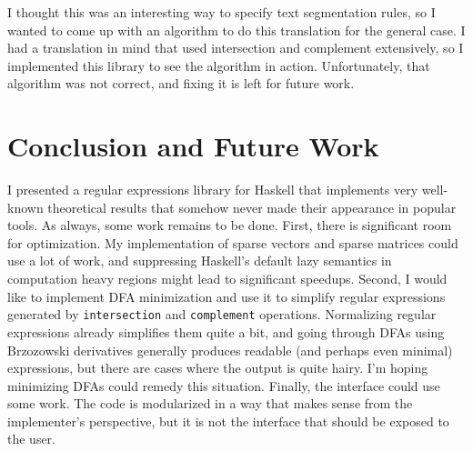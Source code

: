 \documentclass[11pt]{article}
\newcommand{\haskell}{\lstinline}
\begin{document}
I thought this was an interesting way to specify text segmentation rules, so I wanted to come up with an algorithm to do this translation for the general case. I had a translation in mind that used intersection and complement extensively, so I implemented this library to see the algorithm in action. Unfortunately, that algorithm was not correct, and fixing it is left for future work.

\section{Conclusion and Future Work}
  I presented a regular expressions library for Haskell that implements very well-known theoretical results that somehow never made their appearance in popular tools. As always, some work remains to be done. First, there is significant room for optimization.  My implementation of sparse vectors and sparse matrices could use a lot of work, and suppressing Haskell's default lazy semantics in computation heavy regions might lead to significant speedups. Second, I would like to implement DFA minimization and use it to simplify regular expressions generated by \haskell{intersection} and \haskell{complement} operations. Normalizing regular expressions already simplifies them quite a bit, and going through DFAs using Brzozowski derivatives generally produces readable (and perhaps even minimal) expressions, but there are cases where the output is quite hairy. I'm hoping minimizing DFAs could remedy this situation. Finally, the interface could use some work. The code is modularized in a way that makes sense from the implementer's perspective, but it is not the interface that should be exposed to the user.






\end{document}
